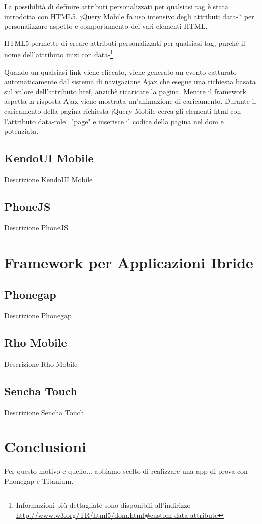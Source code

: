 			La possibilità di definire attributi personalizzati per qualsiasi tag 
			è stata introdotta con HTML5.
			jQuery Mobile fa uso intensivo degli attributi data-* 
			per personalizzare aspetto e comportamento dei vari elementi HTML.
			
			HTML5 permette di creare attributi personalizzati per qualsiasi tag,
			purchè il nome dell'attributo inizi con 
			data-\footnote{Informazioni più dettagliate sono disponibili
			all'indirizzo \url{http://www.w3.org/TR/html5/dom.html\#custom-data-attribute}}
			
			Quando un qualsiasi link viene cliccato, viene generato un evento 
			catturato automaticamente dal sistema di navigazione Ajax che esegue
			una richiesta basata sul valore dell'attributo href, anzichè ricaricare
			la pagina. Mentre il framework aspetta la risposta Ajax viene mostrata
			un'animazione di caricamento. Durante il caricamento della pagina richiesta
			jQuery Mobile cerca gli elementi html con l'attributo data-role="page"
			e inserisce il codice della pagina nel dom e potenziata.
	
		\subsection{KendoUI Mobile}
			Descrizione KendoUI Mobile
	
		\subsection{PhoneJS}
			Descrizione PhoneJS

			
	\section{Framework per Applicazioni Ibride}
	\label{sec:frameworkhybrid}
		\subsection{Phonegap}
			Descrizione Phonegap

		\subsection{Rho Mobile}
			Descrizione Rho Mobile

		\subsection{Sencha Touch}
			Descrizione Sencha Touch
	
	\section{Conclusioni}
		Per questo motivo e quello... abbiamo scelto di realizzare una app di 
		prova con Phonegap e Titanium.
